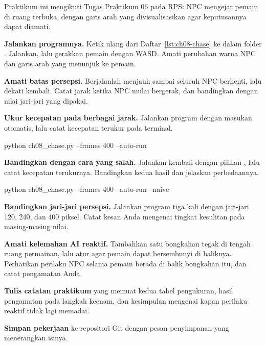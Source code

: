 \begin{praktikumbox}
Praktikum ini mengikuti Tugas Praktikum 06 pada RPS: NPC mengejar pemain di
ruang terbuka, dengan garis arah yang divisualisasikan agar keputusannya dapat
diamati.

\begin{langkah}
  \item \textbf{Jalankan programnya.} Ketik ulang  dari
        Daftar~\ref{lst:ch08-chase} ke dalam folder . Jalankan, lalu
        gerakkan pemain dengan WASD. Amati perubahan warna NPC dan garis arah
        yang menunjuk ke pemain.

  \item \textbf{Amati batas persepsi.} Berjalanlah menjauh sampai seluruh NPC
        berhenti, lalu dekati kembali. Catat jarak ketika NPC mulai bergerak,
        dan bandingkan dengan nilai jari-jari yang dipakai.

  \item \textbf{Ukur kecepatan pada berbagai jarak.} Jalankan program dengan
        masukan otomatis, lalu catat kecepatan terukur pada terminal.
\begin{kodekeluaran}
python ch08_chase.py --frames 400 --auto-run
\end{kodekeluaran}

  \item \textbf{Bandingkan dengan cara yang salah.} Jalankan kembali dengan
        pilihan , lalu catat kecepatan terukurnya. Bandingkan
        kedua hasil dan jelaskan perbedaannya.
\begin{kodekeluaran}
python ch08_chase.py --frames 400 --auto-run --naive
\end{kodekeluaran}

  \item \textbf{Bandingkan jari-jari persepsi.} Jalankan program tiga kali
        dengan jari-jari 120, 240, dan 400 piksel. Catat kesan Anda mengenai
        tingkat kesulitan pada masing-masing nilai.

  \item \textbf{Amati kelemahan AI reaktif.} Tambahkan satu bongkahan tegak di
        tengah ruang permainan, lalu atur agar pemain dapat bersembunyi di
        baliknya. Perhatikan perilaku NPC selama pemain berada di balik
        bongkahan itu, dan catat pengamatan Anda.

  \item \textbf{Tulis catatan praktikum} yang memuat kedua tabel pengukuran,
        hasil pengamatan pada langkah keenam, dan kesimpulan mengenai kapan
        perilaku reaktif tidak lagi memadai.

  \item \textbf{Simpan pekerjaan} ke repositori Git dengan pesan penyimpanan
        yang menerangkan isinya.
\end{langkah}
\end{praktikumbox}

